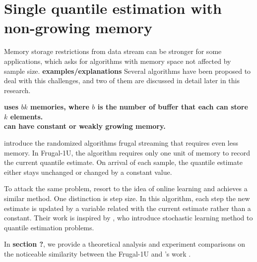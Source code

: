 \pagebreak

\iffalse
\section{Single quantile estimation with non-growing memory}
\label{singlequantile}
Memory storage restrictions from data stream can be stronger for some applications, which asks for algorithms with memory space not affected by sample size. 
\textbf{examples/explanations}
Several algorithms have been proposed to deal with this challenges, and two of them are discussed in detail later in this research.


\textbf{
\citeauthor{mankuApproximateMediansOthera} \cite{mankuApproximateMediansOthera} uses $bk$ memories, where $b$ is the number of buffer that each can store $k$ elements.
\\
\citeauthor{dunningComputingExtremelyAccurate2019} \cite{dunningComputingExtremelyAccurate2019} can have constant or weakly growing memory.
}

\citeauthor{maFrugalStreamingEstimating2014}\cite{maFrugalStreamingEstimating2014} introduce the randomized algorithms frugal streaming that requires even less memory.
In Frugal-1U, the algorithm requires only one unit of memory to record the current quantile estimate. On arrival of each sample, the quantile estimate either stays unchanged or changed by a constant value. 

To attack the same problem, \citeauthor{yazidiQuantileEstimationDynamic2016}\cite{yazidiQuantileEstimationDynamic2016} resort to the idea of online learning and achieves a similar method. 
One distinction is step size. In this algorithm, each step the new estimate is updated by a variable related with the current estimate rather than a constant.
Their work is inspired by \citeauthor{tierneySpaceEfficientRecursiveProcedure1983}\cite{tierneySpaceEfficientRecursiveProcedure1983}, who introduce stochastic learning method to quantile estimation problems. 

In \textbf{section ?}, we provide a theoretical analysis and experiment comparisons on the noticeable similarity between the Frugal-1U and \citeauthor{yazidiQuantileEstimationDynamic2016}'s work . 


\pagebreak 

